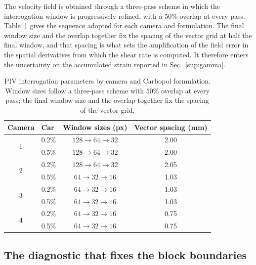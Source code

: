 \documentclass[%
  aip,
  pof,
  reprint,
  floatfix
]{revtex4-2}
\begin{document}
The velocity field is obtained through a three-pass scheme in which the interrogation window is progressively refined, with a $50\%$ overlap at every pass. Table~\ref{tab:sup_piv_windows} gives the sequence adopted for each camera and formulation. The final window size and the overlap together fix the spacing of the vector grid at half the final window, and that spacing is what sets the amplification of the field error in the spatial derivatives from which the shear rate is computed. It therefore enters the uncertainty on the accumulated strain reported in Sec.~\ref{sup:gamma}.

\begin{table}[htb]
\centering
\caption{PIV interrogation parameters by camera and Carbopol formulation. Window sizes follow a three-pass scheme with $50\%$ overlap at every pass; the final window size and the overlap together fix the spacing of the vector grid.}
\label{tab:sup_piv_windows}
\begin{tabular}{c l c c}
\toprule
\textbf{Camera} & \textbf{Car} & \textbf{Window sizes (px)} & \textbf{Vector spacing (mm)} \\
\midrule
\multirow{2}{*}{1} & 0.2\% & $128 \rightarrow 64 \rightarrow 32$ & 2.00 \\
                   & 0.5\% & $128 \rightarrow 64 \rightarrow 32$ & 2.00 \\
\midrule
\multirow{2}{*}{2} & 0.2\% & $128 \rightarrow 64 \rightarrow 32$ & 2.05 \\
                   & 0.5\% & $64 \rightarrow 32 \rightarrow 16$  & 1.03 \\
\midrule
\multirow{2}{*}{3} & 0.2\% & $64 \rightarrow 32 \rightarrow 16$  & 1.03 \\
                   & 0.5\% & $64 \rightarrow 32 \rightarrow 16$  & 1.03 \\
\midrule
\multirow{2}{*}{4} & 0.2\% & $64 \rightarrow 32 \rightarrow 16$  & 0.75 \\
                   & 0.5\% & $64 \rightarrow 32 \rightarrow 16$  & 0.75 \\
\bottomrule
\end{tabular}
\end{table}

\subsection{The diagnostic that fixes the block boundaries}
\end{document}
